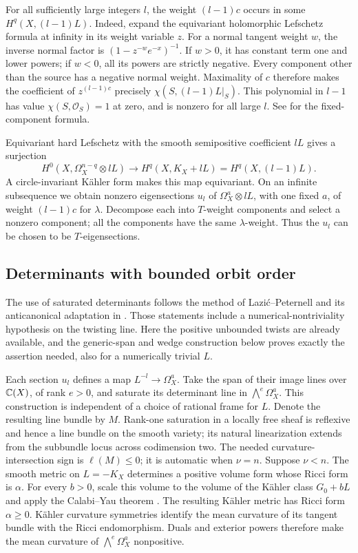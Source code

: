 For all sufficiently large integers $l$, the weight $(l-1)c$ occurs in
some $H^q(X,(l-1)L)$.  Indeed, expand the equivariant holomorphic
Lefschetz formula at infinity in its weight variable $z$.
For a normal tangent weight $w$, the inverse normal factor is
$(1-z^{-w}e^{-x})^{-1}$.  If $w>0$, it has constant term one and lower
powers; if $w<0$, all its powers are strictly negative.  Every component
other than the source has a negative normal weight.  Maximality of $c$
therefore makes the coefficient of $z^{(l-1)c}$ precisely
$\chi(S,(l-1)L|_S)$.  This polynomial in $l-1$ has value
$\chi(S,\mathcal O_S)=1$ at zero, and is nonzero for all large $l$.
See \cite{AtiyahSegal1968,AtiyahSinger1968} for the fixed-component formula.

Equivariant hard Lefschetz with the smooth semipositive coefficient
$lL$ \cite[Theorem~0.1]{DPS2001} gives a surjection
\[
 H^0(X,\Omega_X^{n-q}\otimes lL)\longrightarrow
 H^q(X,K_X+lL)=H^q(X,(l-1)L).
\]
A circle-invariant K\"ahler form makes this map equivariant.  On an
infinite subsequence we obtain nonzero eigensections $u_l$ of
$\Omega_X^a\otimes lL$, with one fixed $a$, of weight $(l-1)c$ for
$\lambda$.  Decompose each into $T$-weight components and select a
nonzero component; all the components have the same $\lambda$-weight.
Thus the $u_l$ can be chosen to be $T$-eigensections.

\subsection{Determinants with bounded orbit order}

The use of saturated determinants follows the method of
Lazi\'c--Peternell \cite[Lemma~4.1]{LP2018} and its anticanonical
adaptation in \cite[Lemma~5.1]{LMPTX2023}. Those statements include
a numerical-nontriviality hypothesis on the twisting line. Here the
positive unbounded twists are already available, and the generic-span
and wedge construction below proves exactly the assertion needed,
also for a numerically trivial $L$.

Each section $u_l$ defines a map $L^{-l}\to\Omega_X^a$. Take the
span of their image lines over $\mathbb C(X)$, of rank $e>0$, and saturate
its determinant line in $\bigwedge^e\Omega_X^a$. This construction is
independent of a choice of rational frame for $L$.  Denote the resulting
line bundle by $M$.  Rank-one saturation in a locally free sheaf is
reflexive and hence a line bundle on the smooth variety; its natural
linearization extends from the subbundle locus across codimension two.
The needed curvature-intersection sign is $\ell(M)\leq0$; it is
automatic when $\nu=n$.  Suppose $\nu<n$.  The smooth metric on
$L=-K_X$ determines a positive volume form whose Ricci form is
$\alpha$.  For every $b>0$, scale this volume to the volume of the
K\"ahler class $G_0+bL$ and apply the Calabi--Yau theorem
\cite{Yau1978}.  The resulting K\"ahler metric has Ricci form
$\alpha\ge0$.  K\"ahler curvature symmetries identify the mean
curvature of its tangent bundle with the Ricci endomorphism.  Duals
and exterior powers therefore make the mean curvature of
$\bigwedge^e\Omega_X^a$ nonpositive.

